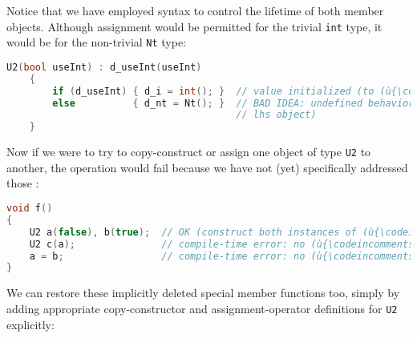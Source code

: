     
\noindent Notice that we have employed  syntax to
control the lifetime of both member objects. Although assignment would
be permitted for the trivial \lstinline!int! type, it would be
 for the non-trivial \lstinline!Nt! type:

\begin{lstlisting}[language=C++]
    U2(bool useInt) : d_useInt(useInt)  
    {
        if (d_useInt) { d_i = int(); }  // value initialized (to (ù{\codeincomments{0}}ù))
        else          { d_nt = Nt(); }  // BAD IDEA: undefined behavior (no 
                                        // lhs object)
    }
\end{lstlisting}

    
\noindent Now if we were to try to copy-construct or assign one object of type
\lstinline!U2! to another, the operation would fail because we have not
(yet) specifically addressed those :

\begin{lstlisting}[language=C++]
void f()
{
    U2 a(false), b(true);  // OK (construct both instances of (ù{\codeincomments{U2}}ù))
    U2 c(a);               // compile-time error: no (ù{\codeincomments{U2(const U2\&)}}ù)
    a = b;                 // compile-time error: no (ù{\codeincomments{U2\& operator=(const U2\&)}}ù)
}
\end{lstlisting}
    
\noindent We can restore these implicitly deleted special member functions too,
simply by adding appropriate copy-constructor and assignment-operator
definitions for \lstinline!U2! explicitly:

